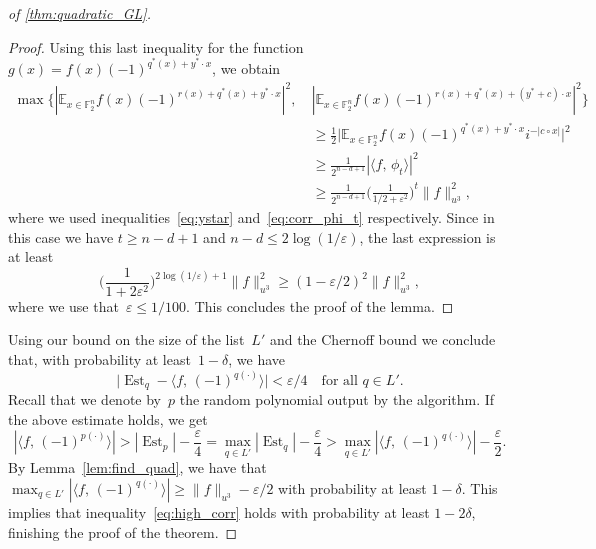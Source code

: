 \documentclass[10pt,a4paper]{amsart}
\newcommand{\E}{\mathbb{E}}
\DeclareMathOperator{\Est}{Est}
\newcommand{\F}{\mathbb{F}} %
\newcommand{\eps}{\varepsilon}
\begin{document}
\begin{proof}[ of \cref{thm:quadratic_GL}]
\begin{proof}
Using this last inequality for the function $g(x) = f(x) (-1)^{q^*(x) + y^*\cdot x}$, we obtain
\begin{align*}
    \max\big\{|\E_{x\in \F_2^n} f(x) (-1)^{r(x) + q^*(x) + y^* \cdot x}|^2,\: &|\E_{x\in \F_2^n} f(x) (-1)^{r(x)+q^*(x) + (y^*+c) \cdot x}|^2 \big\} \\
    &\geq \frac{1}{2} \big|\E_{x\in \F_2^n} f(x) (-1)^{q^*(x) + y^* \cdot x} i^{-|c\circ x|}\big|^2 \\
    &\geq \frac{1}{2^{n-d+1}} |\langle f,\, \phi_t \rangle|^2 \\
    &\geq \frac{1}{2^{n-d+1}} \Big(\frac{1}{1/2+\eps^2}\Big)^t \|f\|_{u^3}^2,
\end{align*}
where we used inequalities~\eqref{eq:ystar} and~\eqref{eq:corr_phi_t} respectively.
Since in this case we have $t\geq n-d+1$ and $n-d\leq 2\log(1/\eps)$, the last expression is at least
$$\Big(\frac{1}{1 + 2\eps^2}\Big)^{2\log(1/\eps)+1} \|f\|_{u^3}^2 \geq (1-\eps/2)^2 \|f\|_{u^3}^2,$$
where we use that~$\eps \leq 1/100$. 
This concludes the proof of the lemma.
\end{proof}

Using our bound on the size of the list~$L'$ and the Chernoff bound we conclude that, with probability at least~$1-\delta$, we have
$$\big|\Est_q - \langle f,\, (-1)^{q(\cdot)}\rangle\big| < \eps/4 \quad \text{for all $q\in L'$.}$$
Recall that we denote by~$p$ the random polynomial output by the algorithm.
If the above estimate holds, we get
$$|\langle f,\, (-1)^{p(\cdot)}\rangle| > |\Est_p| - \frac{\eps}{4} = \max_{q \in L'} |\Est_q| - \frac{\eps}{4} > \max_{q \in L'} |\langle f,\, (-1)^{q(\cdot)}\rangle| - \frac{\eps}{2}.$$
By Lemma~\ref{lem:find_quad}, we have that $\max_{q \in L'} |\langle f,\, (-1)^{q(\cdot)}\rangle| \geq \|f\|_{u^3} - \eps/2$ with probability at least $1-\delta$.
This implies that inequality~\eqref{eq:high_corr} holds with probability at least $1-2\delta$, finishing the proof of the theorem.
\end{proof}
\end{document}
